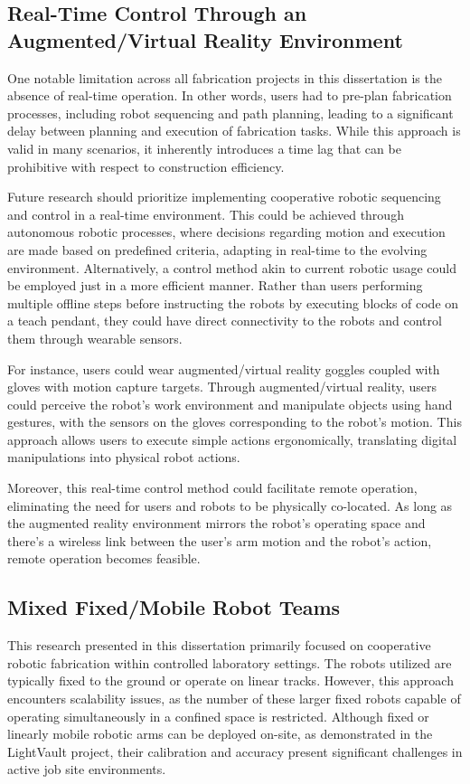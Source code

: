    \subsection{Real-Time Control Through an Augmented/Virtual Reality Environment}
        One notable limitation across all fabrication projects in this dissertation is the absence of real-time operation. In other words, users had to pre-plan fabrication processes, including robot sequencing and path planning, leading to a significant delay between planning and execution of fabrication tasks. While this approach is valid in many scenarios, it inherently introduces a time lag that can be prohibitive with respect to construction efficiency.

        Future research should prioritize implementing cooperative robotic sequencing and control in a real-time environment. This could be achieved through autonomous robotic processes, where decisions regarding motion and execution are made based on predefined criteria, adapting in real-time to the evolving environment. Alternatively, a control method akin to current robotic usage could be employed just in a more efficient manner. Rather than users performing multiple offline steps before instructing the robots by executing blocks of code on a teach pendant, they could have direct connectivity to the robots and control them through wearable sensors.
        
        For instance, users could wear augmented/virtual reality goggles coupled with gloves with motion capture targets. Through augmented/virtual reality, users could perceive the robot's work environment and manipulate objects using hand gestures, with the sensors on the gloves corresponding to the robot's motion. This approach allows users to execute simple actions ergonomically, translating digital manipulations into physical robot actions.
        
        Moreover, this real-time control method could facilitate remote operation, eliminating the need for users and robots to be physically co-located. As long as the augmented reality environment mirrors the robot's operating space and there's a wireless link between the user's arm motion and the robot's action, remote operation becomes feasible.
    
    \subsection{Mixed Fixed/Mobile Robot Teams}
        This research presented in this dissertation primarily focused on cooperative robotic fabrication within controlled laboratory settings. The robots utilized are typically fixed to the ground or operate on linear tracks. However, this approach encounters scalability issues, as the number of these larger fixed robots capable of operating simultaneously in a confined space is restricted. Although fixed or linearly mobile robotic arms can be deployed on-site, as demonstrated in the LightVault project, their calibration and accuracy present significant challenges in active job site environments.

